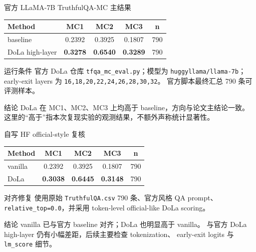 \documentclass[aspectratio=169,11pt]{ctexbeamer}
\newcommand{\code}[1]{\texttt{\small #1}}
\begin{document}
\begin{frame}{官方 LLaMA-7B TruthfulQA-MC 主结果}
  \small
  \begin{table}
    \centering
    \begin{tabular}{lcccc}
      \toprule
      Method & MC1 & MC2 & MC3 & n \\
      \midrule
      baseline & 0.2392 & 0.3925 & 0.1807 & 790 \\
      DoLa high-layer & \textbf{0.3278} & \textbf{0.6540} & \textbf{0.3289} & 790 \\
      \bottomrule
    \end{tabular}
  \end{table}

  \vspace{0.4em}
  \begin{block}{运行条件}
    官方 DoLa 仓库 \code{tfqa\_mc\_eval.py}；模型为 \code{huggyllama/llama-7b}；
    early-exit layers 为 \code{16,18,20,22,24,26,28,30,32}。
    官方脚本最终汇总 790 条可评测样本。
  \end{block}

  \begin{block}{结论}
    DoLa 在 MC1、MC2、MC3 上均高于 baseline，方向与论文主结论一致。
    这里的“高于”指本次复现实验的观测结果，不额外声称统计显著性。
  \end{block}
\end{frame}

\begin{frame}{自写 HF official-style 复核}
  \small
  \begin{table}
    \centering
    \begin{tabular}{lcccc}
      \toprule
      Method & MC1 & MC2 & MC3 & n \\
      \midrule
      vanilla & 0.2392 & 0.3925 & 0.1807 & 790 \\
      DoLa & \textbf{0.3038} & \textbf{0.6445} & \textbf{0.3148} & 790 \\
      \bottomrule
    \end{tabular}
  \end{table}

  \vspace{0.4em}
  \begin{block}{对齐修复}
    使用原始 \code{TruthfulQA.csv} 790 条、官方风格 QA prompt、
    \code{relative\_top=0.0}，并采用 token-level official-like DoLa scoring。
  \end{block}

  \begin{block}{结论}
    vanilla 已与官方 baseline 对齐；DoLa 也明显高于 vanilla。
    与官方 DoLa high-layer 仍有小幅差距，后续主要检查 tokenization、
    early-exit logits 与 \code{lm\_score} 细节。
  \end{block}
\end{frame}
\end{document}
